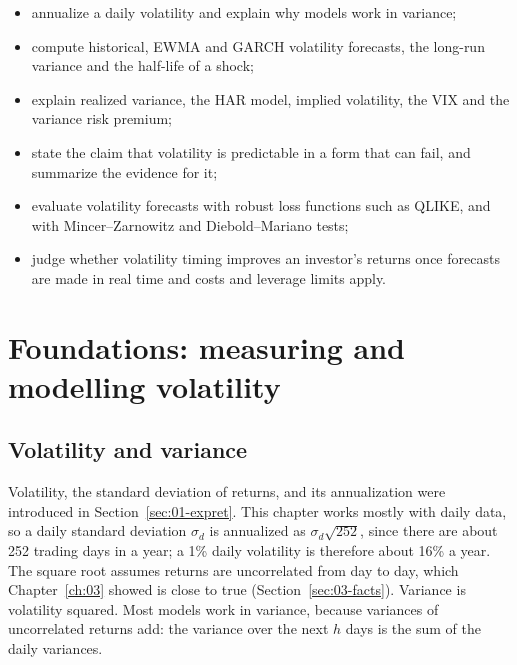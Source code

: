 \begin{itemize}
  \item annualize a daily volatility and explain why models work in variance;
  \item compute historical, EWMA and GARCH volatility forecasts, the long-run variance and the half-life of a shock;
  \item explain realized variance, the HAR model, implied volatility, the VIX and the variance risk premium;
  \item state the claim that volatility is predictable in a form that can fail, and summarize the evidence for it;
  \item evaluate volatility forecasts with robust loss functions such as QLIKE, and with Mincer--Zarnowitz and Diebold--Mariano tests;
  \item judge whether volatility timing improves an investor's returns once forecasts are made in real time and costs and leverage limits apply.
\end{itemize}

\section{Foundations: measuring and modelling volatility}
\label{sec:11-foundations}

\subsection{Volatility and variance}

Volatility, the standard deviation of returns, and its annualization were introduced in Section~\ref{sec:01-expret}. This chapter works mostly with daily data, so a daily standard deviation $\sigma_d$ is annualized as $\sigma_d\sqrt{252}$, since there are about 252 trading days in a year; a 1\% daily volatility is therefore about 16\% a year. The square root assumes returns are uncorrelated from day to day, which Chapter~\ref{ch:03} showed is close to true (Section~\ref{sec:03-facts}). Variance is volatility squared. Most models work in variance, because variances of uncorrelated returns add: the variance over the next $h$ days is the sum of the daily variances.

